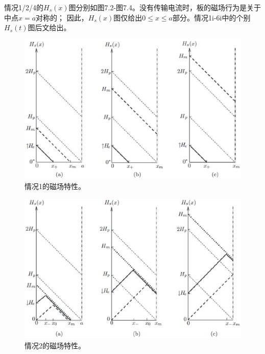 情况1/2/4的$H_s(x)$图分别如图7.2-图7.4。没有传输电流时，板的磁场行为是关于中点$x=a$对称的；
因此，$H_s(x)$图仅给出$0\le x\le a$部分。情况1i-6i中的个别$H_s(t)$图后文给出。
\begin{figure}[htbp]
	\centering
	\includegraphics[scale=0.6]{chpt7/figs/fig7.2.eps}
	\caption{情况1的磁场特性。}
\end{figure}
\begin{figure}[htbp]
	\centering
	\includegraphics[scale=0.6]{chpt7/figs/fig7.3.eps}
	\caption{情况2的磁场特性。}
\end{figure}
